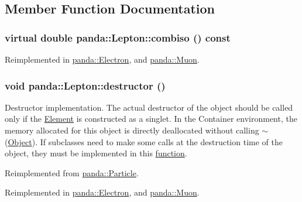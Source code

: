 \subsection{Member Function Documentation}
\hypertarget{classpanda_1_1Lepton_a13fd748ab9e1b76e5cc8391723cc5ea7}{
\subsubsection[{combiso}]{\setlength{\rightskip}{0pt plus 5cm}virtual double panda::Lepton::combiso () const}}
\label{classpanda_1_1Lepton_a13fd748ab9e1b76e5cc8391723cc5ea7}


Reimplemented in \hyperlink{classpanda_1_1Electron_a68eb50798d64b6bafaa21aac9e67f0d6}{panda::Electron}, and \hyperlink{classpanda_1_1Muon_a3eb5df88e49b5510c00a6f02ce61def0}{panda::Muon}.\hypertarget{classpanda_1_1Lepton_af8bb4d531bdddbf51f479f7eb0dae175}{
\subsubsection[{destructor}]{\setlength{\rightskip}{0pt plus 5cm}void panda::Lepton::destructor ()}}
\label{classpanda_1_1Lepton_af8bb4d531bdddbf51f479f7eb0dae175}


Destructor implementation. The actual destructor of the object should be called only if the \hyperlink{classpanda_1_1Element}{Element} is constructed as a singlet. In the Container environment, the memory allocated for this object is directly deallocated without calling $\sim$(\hyperlink{classpanda_1_1Object}{Object}). If subclasses need to make some calls at the destruction time of the object, they must be implemented in this \hyperlink{namespacepanda_1_1function}{function}. 

Reimplemented from \hyperlink{classpanda_1_1Particle_ad1a5f606b804ac2ec5d7e391aba6bda6}{panda::Particle}.

Reimplemented in \hyperlink{classpanda_1_1Electron_a9e9a34d904d5cc02ab895e73cdaf6d7f}{panda::Electron}, and \hyperlink{classpanda_1_1Muon_aa982002bedb53cacab127270c53e54e8}{panda::Muon}.

